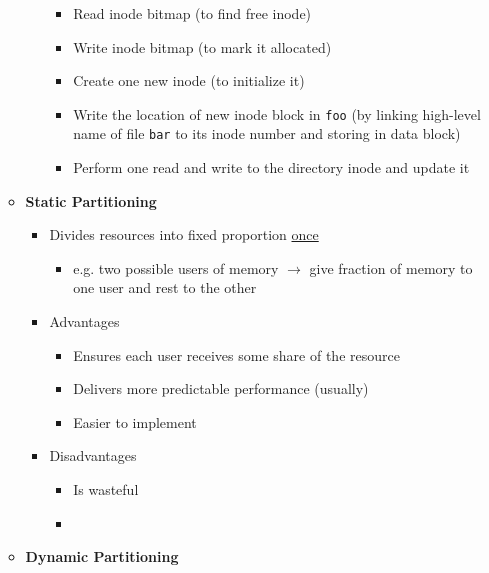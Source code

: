 \documentclass[12pt]{article}
\begin{document}
\begin{enumerate}[1.]
\begin{itemize}
\begin{itemize}
            \begin{itemize}
                \item Read inode bitmap (to find free inode)
                \item Write inode bitmap (to mark it allocated)
                \item Create one new inode (to initialize it)
                \item Write the location of new inode block in \texttt{foo} (by linking high-level name of file \texttt{bar} to its inode number and storing in data block)
                \item Perform one read and write to the directory inode and update it
            \end{itemize}
        \end{itemize}

        \item \textbf{Static Partitioning}

        \begin{itemize}
            \item Divides resources into fixed proportion \underline{once}
            \begin{itemize}
                \item e.g. two possible users of memory $\to$ give fraction of memory to one user and
                rest to the other
            \end{itemize}
            \item Advantages
            \begin{itemize}
                \item Ensures each user receives some share of the resource
                \item Delivers more predictable performance (usually)
                \item Easier to implement
            \end{itemize}
            \item Disadvantages
            \begin{itemize}
                \item Is wasteful
                \item
            \end{itemize}
        \end{itemize}

        \item \textbf{Dynamic Partitioning}


\end{itemize}
\end{enumerate}
\end{document}
